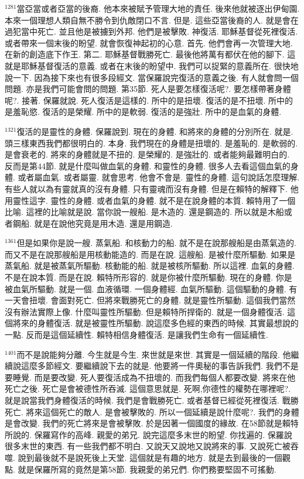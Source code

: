 \documentclass{book}
\begin{document}
$^{1281}$當亞當或者亞當的後裔.
他本來被賦予管理大地的責任.
後來他就被逐出伊甸園.
本來一個理想人類自無不勝令到仇敵閉口不言.
但是.
這些亞當後裔的人.
就是會在過犯當中死亡.
並且他是被擄到外邦.
他們是被擊敗.
神復活.
耶穌基督從死裡復活.
或者帶來一個末後的盼望.
就會恢復神起初的心意.
首先.
他們會再一次管理大地.
在新的創造底下作王.
第二.
耶穌基督戰勝死亡.
最後他將萬有都伏在他的腳下.
這就是耶穌基督復活的意義.
或者在末後的盼望中.
我們可以捉緊的意義所在.
很快地說一下.
因為接下來也有很多段經文.
當保羅說完復活的意義之後.
有人就會問一個問題.
亦是我們可能會問的問題.
第35節.
死人是要怎樣復活呢?.
要怎樣帶著身體呢?.
接著.
保羅就說.
死人復活是這樣的.
所中的是扭壞.
復活的是不扭壞.
所中的是羞恥慾.
復活的是榮耀.
所中的是軟弱.
復活的是強壯.
所中的是血氣的身體.

$^{1321}$復活的是靈性的身體.
保羅說到.
現在的身體.
和將來的身體的分別所在.
就是.
頭三樣東西我們都很明白的.
本身.
我們現在的身體是扭壞的.
是羞恥的.
是軟弱的.
是會衰老的.
將來的身體就是不扭的.
是榮耀的.
是強壯的.
或者能夠最難明白的.
反而是第44節.
就是什麼叫做血氣的身體.
和靈性的身體.
很多人去看這個血氣的身體.
或者屬血氣.
或者屬靈.
就會思考.
他會不會是.
靈性的身體.
這句說話怎麼理解.
有些人就以為有靈就真的沒有身體.
只有靈魂而沒有身體.
但是在賴特的解釋下.
他用靈性這字.
靈性的身體.
或者血氣的身體.
就不是在說身體的本質.
賴特用了一個比喻.
這裡的比喻就是說.
當你說一艘船.
是木造的.
還是鋼造的.
所以就是木船或者鋼船.
就是在說他究竟是用木造.
還是用鋼造.

$^{1361}$但是如果你是說一艘.
蒸氣船.
和核動力的船.
就不是在說那艘船是由蒸氣造的.
而又不是在說那艘船是用核動能造的.
而是在說.
這艘船.
是被什麼所驅動.
如果是蒸氣船.
就是被蒸氣所驅動.
核動能的船.
就是被核所驅動.
所以這裡.
血氣的身體.
不是在說本質.
而是在說.
賴特所形容的.
就是你被什麼所驅動.
現在的身體.
你是被血氣所驅動.
就是一個.
血液循環.
一個身體經.
血氣所驅動.
這個驅動的身體.
有一天會扭壞.
會面對死亡.
但將來戰勝死亡的身體.
就是靈性所驅動.
這個我們當然沒有辦法實際上像.
什麼叫靈性所驅動.
但是賴特所捍衛的.
就是一個身體復活.
這個將來的身體復活.
就是被靈性所驅動.
說這麼多色經的東西的時候.
其實最想說的一點.
反而是這個延續性.
賴特相信身體復活.
是讓我們生命有一個延續性.

$^{1401}$而不是說能夠分離.
今生就是今生.
來世就是來世.
其實是一個延續的階段.
他繼續說這麼多節經文.
要繼續說下去的就是.
他要將一件奧秘的事告訴我們.
我們不是要睡覺.
而是要改變.
死人要復活成為不扭壞的.
而我們每個人都要改變.
將來在他死亡之後.
死亡是會被德性所吞滅.
這個意思就是.
死啊,你德性的權勢在哪裡呢?.
就是說當我們身體復活的時候.
我們是會戰勝死亡.
或者基督已經從死裡復活.
戰勝死亡.
將來這個死亡的敵人.
是會被擊敗的.
所以一個延續是說什麼呢?.
我們的身體是會改變.
我們的死亡將來是會被擊敗.
於是因著一個國度的緣故.
在58節就是賴特所說的.
保羅寫作的高峰.
親愛的弟兄.
說完這麼多末世的盼望.
你找遍的.
保羅說很多末世的東西.
有一些我們都不明白.
又說天又說地又說將來的事.
又說死亡被吞噬.
說到最後就不是說死後上天堂.
這個就是有趣的地方.
就是去到最後的一個觀點.
就是保羅所寫的竟然是第58節.
我親愛的弟兄們.
你們務要堅固不可搖動.
\end{document}
